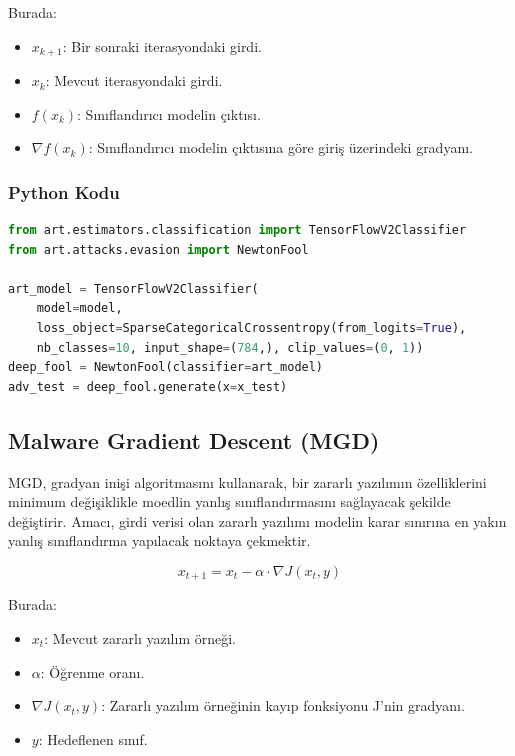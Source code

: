 Burada:

\begin{itemize}
    \item $x_{k+1}$: Bir sonraki iterasyondaki girdi.
    \item $x_k$: Mevcut iterasyondaki girdi.
    \item $f(x_k)$: Sınıflandırıcı modelin çıktısı.
    \item $\nabla f(x_k)$: Sınıflandırıcı modelin çıktısına göre giriş üzerindeki gradyanı.
\end{itemize}

\subsubsection{Python Kodu}

\begin{lstlisting}[language=Python]
from art.estimators.classification import TensorFlowV2Classifier
from art.attacks.evasion import NewtonFool

art_model = TensorFlowV2Classifier(
    model=model, 
    loss_object=SparseCategoricalCrossentropy(from_logits=True), 
    nb_classes=10, input_shape=(784,), clip_values=(0, 1))
deep_fool = NewtonFool(classifier=art_model)
adv_test = deep_fool.generate(x=x_test)
\end{lstlisting}

\newpage

\subsection{Malware Gradient Descent (MGD)}

MGD, gradyan inişi algoritmasını kullanarak, bir zararlı yazılımın özelliklerini minimum değişiklikle moedlin yanlış sınıflandırmasını sağlayacak şekilde değiştirir. Amacı, girdi verisi olan zararlı yazılımı modelin karar sınırına en yakın yanlış sınıflandırma yapılacak noktaya çekmektir.

\[ x_{t+1} = x_t - \alpha \cdot \nabla J(x_t, y) \]

Burada:

\begin{itemize}
    \item $x_t$: Mevcut zararlı yazılım örneği.
    \item $\alpha$: Öğrenme oranı.
    \item $\nabla J(x_t, y)$: Zararlı yazılım örneğinin kayıp fonksiyonu J'nin gradyanı.
    \item $y$: Hedeflenen sınıf.
\end{itemize}

